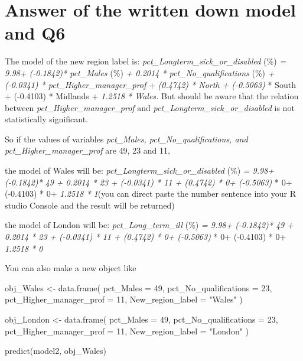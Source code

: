 \documentclass[
  letterpaper,
  DIV=11,
  numbers=noendperiod]{scrreprt}
\newenvironment{Shaded}{\begin{snugshade}}{\end{snugshade}}
\newcommand{\AttributeTok}[1]{\textcolor[rgb]{0.40,0.45,0.13}{#1}}
\newcommand{\DecValTok}[1]{\textcolor[rgb]{0.68,0.00,0.00}{#1}}
\newcommand{\FunctionTok}[1]{\textcolor[rgb]{0.28,0.35,0.67}{#1}}
\newcommand{\NormalTok}[1]{\textcolor[rgb]{0.00,0.23,0.31}{#1}}
\newcommand{\OtherTok}[1]{\textcolor[rgb]{0.00,0.23,0.31}{#1}}
\newcommand{\StringTok}[1]{\textcolor[rgb]{0.13,0.47,0.30}{#1}}
\begin{document}
\section{\texorpdfstring{\textbf{Answer of the written down model and
Q6}}{Answer of the written down model and Q6}}\label{answer-of-the-written-down-model-and-q6}

The model of the new region label is:
\emph{pct\_Longterm\_sick\_or\_disabled} (\%) \emph{= 9.98+ (-0.1842)*
pct\_Males} (\%) \emph{+ 0.2014 * pct\_No\_qualifications} (\%) \emph{+
(-0.0341) * pct\_Higher\_manager\_prof} + \emph{(0.4742) * North +
(-0.5063)} * South + (-0.4103) * Midlands + \emph{1.2518 * Wales.} But
should be aware that the relation between
\emph{pct\_Higher\_manager\_prof} and
\emph{pct\_Longterm\_sick\_or\_disabled} is not statistically
significant.

So if the values of variables \emph{pct\_Males, pct\_No\_qualifications,
and pct\_Higher\_manager\_prof} are 49, 23 and 11,

the model of Wales will be: \emph{pct\_Longterm\_sick\_or\_disabled}
(\%) \emph{= 9.98+ (-0.1842)* 49} \emph{+ 0.2014 * 23} \emph{+ (-0.0341)
* 11 + (0.4742) * 0+ (-0.5063)} * 0+ (-0.4103) * 0+ \emph{1.2518 *
1}(you can direct paste the number sentence into your R studio Console
and the result will be returned)

the model of London will be: \emph{pct\_Long\_term\_ill} (\%) \emph{=
9.98+ (-0.1842)* 49} \emph{+ 0.2014 * 23} \emph{+ (-0.0341) * 11 +
(0.4742) * 0+ (-0.5063)} * 0+ (-0.4103) * 0+ \emph{1.2518 * 0}

You can also make a new object like

\begin{Shaded}
\begin{Highlighting}[]
\NormalTok{obj\_Wales }\OtherTok{\textless{}{-}} \FunctionTok{data.frame}\NormalTok{(}
  \AttributeTok{pct\_Males =} \DecValTok{49}\NormalTok{,}
  \AttributeTok{pct\_No\_qualifications =} \DecValTok{23}\NormalTok{,}
  \AttributeTok{pct\_Higher\_manager\_prof =} \DecValTok{11}\NormalTok{,}
  \AttributeTok{New\_region\_label =} \StringTok{"Wales"}
\NormalTok{)}

\NormalTok{obj\_London }\OtherTok{\textless{}{-}} \FunctionTok{data.frame}\NormalTok{(}
  \AttributeTok{pct\_Males =} \DecValTok{49}\NormalTok{,}
  \AttributeTok{pct\_No\_qualifications =} \DecValTok{23}\NormalTok{,}
  \AttributeTok{pct\_Higher\_manager\_prof =} \DecValTok{11}\NormalTok{,}
  \AttributeTok{New\_region\_label =} \StringTok{"London"}
\NormalTok{)}

\FunctionTok{predict}\NormalTok{(model2, obj\_Wales)}
\end{Highlighting}
\end{Shaded}
\end{document}

